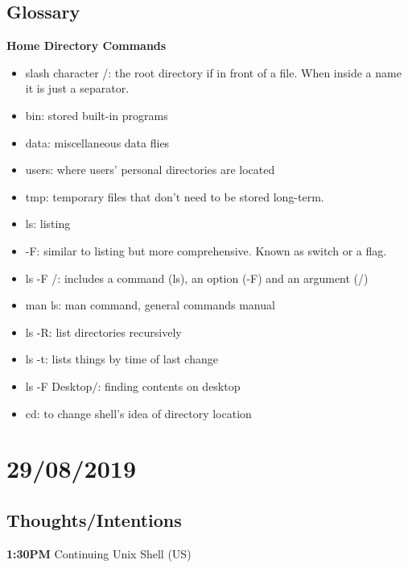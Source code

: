\documentclass{article}
\begin{document}
\subsection{Glossary}
\textbf{Home Directory Commands}
\begin{itemize}
\item slash character /: the root directory if in front of a file. When inside a name it is just a separator.
\item bin: stored built-in programs
\item data: miscellaneous data flies
\item users: where users' personal directories are located
\item tmp: temporary files that don't need to be stored long-term.
\item ls: listing 
\item -F: similar to listing but more comprehensive. Known as switch or a flag.
\item ls -F /: includes a command (ls), an option (-F) and an argument (/)
\item man ls: man command, general commands manual
\item ls -R: list directories recursively
\item ls -t: lists things by time of last change 
\item ls -F Desktop/: finding contents on desktop
\item cd: to change shell's idea of directory location
\end{itemize}

\section{29/08/2019}
\subsection{Thoughts/Intentions}
\textbf{1:30PM }Continuing Unix Shell (US)
\end{document}
